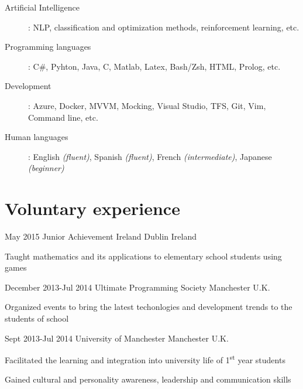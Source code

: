 \documentclass[10pt]{CurriculumVitae}
\begin{document}
    \begin{description}
       \item[Artificial Intelligence]: NLP, classification and optimization methods, reinforcement learning, etc.
       \item[Programming languages]: C\#, Pyhton, Java, C, Matlab, Latex, Bash/Zsh, HTML, Prolog, etc.
       \item[Development]: Azure, Docker, MVVM, Mocking, Visual Studio, TFS, Git, Vim, Command line, etc.
       \item[Human languages]: English \emph{(fluent)}, Spanish \emph{(fluent)}, French \emph{(intermediate)}, Japanese \emph{(beginner)}
    \end{description}


  \section{Voluntary experience}
     
      {May 2015}
      {Junior Achievement Ireland}
      {Dublin}
      {Ireland}
      {
         \item Taught mathematics and its applications to elementary school students using games
      }

      {December 2013-Jul 2014}
      {Ultimate Programming Society}
      {Manchester}
      {U.K.}
      {
         \item Organized events to bring the latest techonlogies and development trends to the students of school
      }

      {Sept 2013-Jul 2014}
      {University of Manchester}
      {Manchester}
      {U.K.}
      {
         \item Facilitated the learning and integration into university life of 1\textsuperscript{st} year students
         \item Gained cultural and personality awareness, leadership and communication skills
      }
\end{document}
